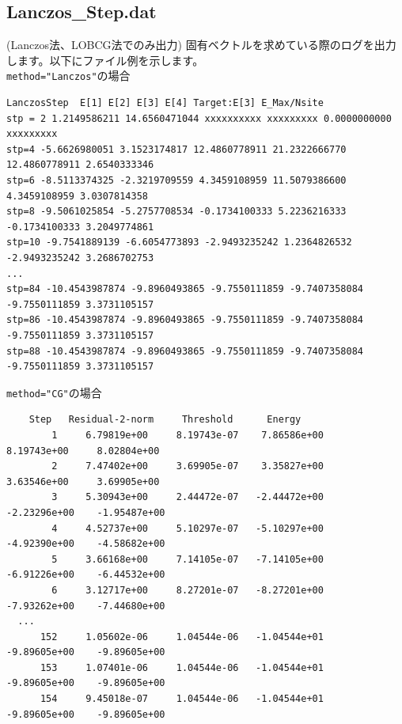 \newpage
\subsection{Lanczos\_Step.dat}
(Lanczos法、LOBCG法でのみ出力) 固有ベクトルを求めている際のログを出力します。以下にファイル例を示します。\\

\hspace{-2cm}
\verb|method="Lanczos"|の場合
\\
\hspace{-2cm}
\begin{minipage}{19cm}
  \small
\begin{screen}
\begin{verbatim}
LanczosStep  E[1] E[2] E[3] E[4] Target:E[3] E_Max/Nsite
stp = 2 1.2149586211 14.6560471044 xxxxxxxxxx xxxxxxxxx 0.0000000000 xxxxxxxxx
stp=4 -5.6626980051 3.1523174817 12.4860778911 21.2322666770 12.4860778911 2.6540333346
stp=6 -8.5113374325 -2.3219709559 4.3459108959 11.5079386600 4.3459108959 3.0307814358
stp=8 -9.5061025854 -5.2757708534 -0.1734100333 5.2236216333 -0.1734100333 3.2049774861
stp=10 -9.7541889139 -6.6054773893 -2.9493235242 1.2364826532 -2.9493235242 3.2686702753
...
stp=84 -10.4543987874 -9.8960493865 -9.7550111859 -9.7407358084 -9.7550111859 3.3731105157
stp=86 -10.4543987874 -9.8960493865 -9.7550111859 -9.7407358084 -9.7550111859 3.3731105157
stp=88 -10.4543987874 -9.8960493865 -9.7550111859 -9.7407358084 -9.7550111859 3.3731105157
\end{verbatim}
\end{screen}
\normalsize
\end{minipage}

\hspace{-2cm}
\verb|method="CG"|の場合
\\
\hspace{-2cm}
\begin{minipage}{19cm}
    \small
\begin{screen}
\begin{verbatim}
    Step   Residual-2-norm     Threshold      Energy
        1     6.79819e+00     8.19743e-07    7.86586e+00     8.19743e+00     8.02804e+00
        2     7.47402e+00     3.69905e-07    3.35827e+00     3.63546e+00     3.69905e+00
        3     5.30943e+00     2.44472e-07   -2.44472e+00    -2.23296e+00    -1.95487e+00
        4     4.52737e+00     5.10297e-07   -5.10297e+00    -4.92390e+00    -4.58682e+00
        5     3.66168e+00     7.14105e-07   -7.14105e+00    -6.91226e+00    -6.44532e+00
        6     3.12717e+00     8.27201e-07   -8.27201e+00    -7.93262e+00    -7.44680e+00
  ...
      152     1.05602e-06     1.04544e-06   -1.04544e+01    -9.89605e+00    -9.89605e+00
      153     1.07401e-06     1.04544e-06   -1.04544e+01    -9.89605e+00    -9.89605e+00
      154     9.45018e-07     1.04544e-06   -1.04544e+01    -9.89605e+00    -9.89605e+00
\end{verbatim}
\end{screen}
\normalsize
\end{minipage}

